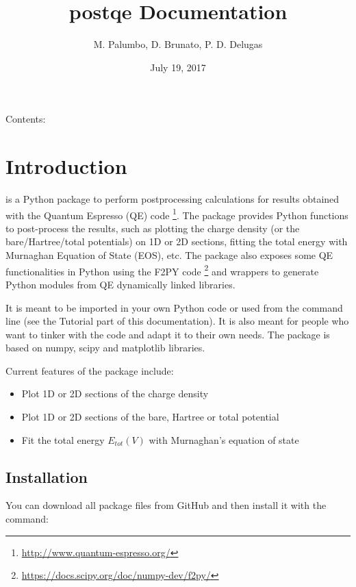 \documentclass[letterpaper,10pt,english]{sphinxmanual}
\title{postqe Documentation}
\date{July 19, 2017}
\author{M. Palumbo, D. Brunato, P. D. Delugas}
\begin{document}
\maketitle
\tableofcontents
{}\label{index::doc}


Contents:


\chapter{Introduction}
\label{introduction:introduction}\label{introduction:id1}\label{introduction::doc}\label{introduction:welcome-to-postqe-s-documentation}
 is a Python package to perform postprocessing calculations for results obtained with the Quantum Espresso (QE) code \footnote[1]{
\href{http://www.quantum-espresso.org/}{http://www.quantum-espresso.org/}
}. The package provides Python functions to post-process the results, such as plotting the charge density (or the bare/Hartree/total potentials) on 1D or 2D sections, fitting the total energy with Murnaghan Equation of State (EOS), etc. The package also exposes some QE functionalities in Python using the F2PY code \footnote[2]{
\href{https://docs.scipy.org/doc/numpy-dev/f2py/}{https://docs.scipy.org/doc/numpy-dev/f2py/}
} and wrappers to generate Python modules from QE dynamically linked libraries.

It is meant to be imported in your own Python code or used from the command line (see the Tutorial part of this documentation). It is also meant for people who want to tinker with the code and adapt it to their own needs. The package is based on numpy, scipy and matplotlib libraries.

Current features of the package include:
\begin{itemize}
\item {} 
Plot 1D or 2D sections of the charge density

\item {} 
Plot 1D or 2D sections of the bare, Hartree or total potential

\item {} 
Fit the total energy \(E_{tot}(V)\) with Murnaghan's equation of state

\end{itemize}


\section{Installation}
\label{introduction:installation}
You can download all package files from GitHub  and then install it with the command:
\end{document}
